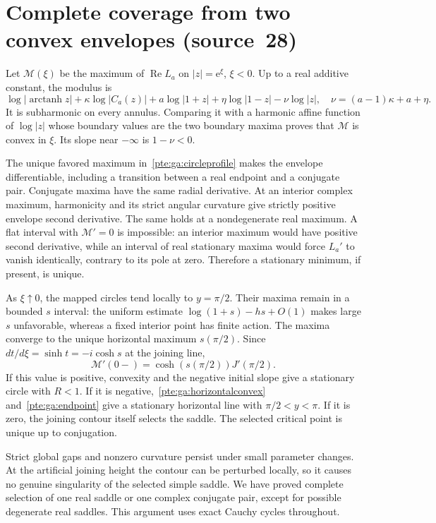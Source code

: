 \documentclass[11pt,a4paper]{article}
\numberwithin{equation}{section}
\theoremstyle{definition}
\theoremstyle{plain}
\newcommand{\ee}{\mathrm e}
\newcommand{\src}[1]{\texorpdfstring{\textup{(source~#1)}}{(source #1)}}
\begin{document}
\section{Complete coverage from two convex envelopes \src{28}}\label{pte:sec:ga-coverage}
Let $\mathcal M(\xi)$ be the maximum of $\operatorname{Re}L_a$ on $|z|=\ee^\xi$, $\xi<0$. Up to a real additive constant, the modulus is
\begin{equation}\label{pte:ga:subharmonic}
 \log|\operatorname{arctanh}z|+\kappa\log|C_a(z)|
 +a\log|1+z|+\eta\log|1-z|-\nu\log|z|,
 \quad \nu=(a-1)\kappa+a+\eta.
\end{equation}
It is subharmonic on every annulus. Comparing it with a harmonic affine function of $\log|z|$ whose boundary values are the two boundary maxima proves that $\mathcal M$ is convex in $\xi$. Its slope near $-\infty$ is $1-\nu<0$.

The unique favored maximum in~\eqref{pte:ga:circleprofile} makes the envelope differentiable, including a transition between a real endpoint and a conjugate pair. Conjugate maxima have the same radial derivative. At an interior complex maximum, harmonicity and its strict angular curvature give strictly positive envelope second derivative. The same holds at a nondegenerate real maximum. A flat interval with $\mathcal M'=0$ is impossible: an interior maximum would have positive second derivative, while an interval of real stationary maxima would force $L_a'$ to vanish identically, contrary to its pole at zero. Therefore a stationary minimum, if present, is unique.

As $\xi\uparrow0$, the mapped circles tend locally to $y=\pi/2$. Their maxima remain in a bounded $s$ interval: the uniform estimate $\log(1+s)-hs+O(1)$ makes large $s$ unfavorable, whereas a fixed interior point has finite action. The maxima converge to the unique horizontal maximum $s(\pi/2)$. Since $dt/d\xi=\sinh t=-i\cosh s$ at the joining line,
\begin{equation}\label{pte:ga:join}
 \mathcal M'(0-)=\cosh(s(\pi/2))J'(\pi/2).
\end{equation}
If this value is positive, convexity and the negative initial slope give a stationary circle with $R<1$. If it is negative,~\eqref{pte:ga:horizontalconvex} and~\eqref{pte:ga:endpoint} give a stationary horizontal line with $\pi/2<y<\pi$. If it is zero, the joining contour itself selects the saddle. The selected critical point is unique up to conjugation.

Strict global gaps and nonzero curvature persist under small parameter changes. At the artificial joining height the contour can be perturbed locally, so it causes no genuine singularity of the selected simple saddle. We have proved complete selection of one real saddle or one complex conjugate pair, except for possible degenerate real saddles. This argument uses exact Cauchy cycles throughout.
\end{document}
